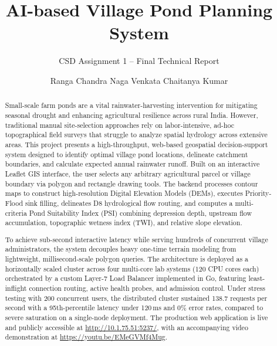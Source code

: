 \documentclass[manuscript,screen,review]{acmart}
\begin{document}
\title{AI-based Village Pond Planning System}
\subtitle{CSD Assignment 1 -- Final Technical Report}

\author{Ranga Chandra Naga Venkata Chaitanya Kumar}

\renewcommand{\shortauthors}{Chaitanya Kumar}

\begin{abstract}
Small-scale farm ponds are a vital rainwater-harvesting intervention for mitigating seasonal drought and enhancing agricultural resilience across rural India. However, traditional manual site-selection approaches rely on labor-intensive, ad-hoc topographical field surveys that struggle to analyze spatial hydrology across extensive areas. This project presents a high-throughput, web-based geospatial decision-support system designed to identify optimal village pond locations, delineate catchment boundaries, and calculate expected annual rainwater runoff. Built on an interactive Leaflet GIS interface, the user selects any arbitrary agricultural parcel or village boundary via polygon and rectangle drawing tools. The backend processes contour maps to construct high-resolution Digital Elevation Models (DEMs), executes Priority-Flood sink filling, delineates D8 hydrological flow routing, and computes a multi-criteria Pond Suitability Index (PSI) combining depression depth, upstream flow accumulation, topographic wetness index (TWI), and relative slope elevation. 

To achieve sub-second interactive latency while serving hundreds of concurrent village administrators, the system decouples heavy one-time terrain modeling from lightweight, millisecond-scale polygon queries. The architecture is deployed as a horizontally scaled cluster across four multi-core lab systems (120 CPU cores each) orchestrated by a custom Layer-7 Load Balancer implemented in Go, featuring least-inflight connection routing, active health probes, and admission control. Under stress testing with 200 concurrent users, the distributed cluster sustained 138.7 requests per second with a 95th-percentile latency under 120\,ms and 0\% error rates, compared to severe saturation on a single-node deployment. The production web application is live and publicly accessible at \url{http://10.1.75.51:5237/}, with an accompanying video demonstration at \url{https://youtu.be/EMeGVMf4Mug}.
\end{abstract}
\end{document}
